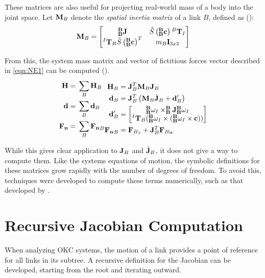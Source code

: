 These matrices are also useful for projecting real-world mass of a body into the joint space. Let $\mathbf{M}_B$ denote the \emph{spatial inertia matrix} of a link $B$, defined as (\cite{featherstone_2007}):
\begin{align} \label{eqn:spat_mass}
	\mathbf{M}_B =
	\begin{bmatrix}
	^\mathbf{B}_\mathbf{B}\mathbf{J}                 & \mathring{S}\left(^\mathbf{B}_\mathbf{B}\mathbf{c}\right){^B\mathbf{T}_I} \\
	{^I\mathbf{T}_B}\mathring{S}\left(^\mathbf{B}_\mathbf{B}\mathbf{c}\right)^T & m_B {\mathbf{I}}_{3x3}      
	\end{bmatrix}
\end{align}

\noindent From this, the system mass matrix and vector of fictitious forces vector described in \ref{eqn:NE1} can be computed (\cite{isenberg_2020}).
\begin{align} \label{eqn:NE2}
	\begin{split}
	{\mathbf{H}}    & = \Big.\sum_B {\mathbf{H}}_B                           \\
	{\mathbf{d}}    & = \Big.\sum_B {\mathbf{d}}_B                           \\
	{\mathbf{F_n}}   & =  \Big.\sum_B {\mathbf{F_n}}_B                         
	\end{split}
	\begin{split}
	{\mathbf{H}}_B  & = {\mathbf{J}^T_B}\mathbf{M}_B\mathbf{J}_B                           \\
	{\mathbf{d}}_B  & = \mathbf{J}^T_B \left (\mathbf{M}_B \dot{\mathbf{J}}_B + {\mathbf{d}}'_B \right) \\
	{\mathbf{d}}_B' & = \begin{bmatrix}                            
	{^\mathbf{B}_\mathbf{B}\omega_I } \times ^\mathbf{B}_\mathbf{B}\mathbf{J} {^\mathbf{B}_\mathbf{B}\omega_I} \\
	{^I\mathbf{T}_B}  (^\mathbf{B}_\mathbf{B}\omega_I \times (^\mathbf{B}_\mathbf{B}\omega_I \times \mathbf{c}))\\
	\end{bmatrix} \\
	{\mathbf{F_n}}_B & = {\mathbf{F}}_{B_J} + \mathbf{J}_B^T {\mathbf{F}}_{B_W}
	\end{split} 
\end{align}

\noindent While this gives clear application to {$\mathbf{J}_B$} and $\dot{\mathbf{J}}_B$, it does not give a way to compute them. Like the systems equations of motion, the symbolic definitions for these matrices grow rapidly with the number of degrees of freedom. To avoid this, techniques were developed to compute these terms numerically, such as that developed by \cite{isenberg_2020}.

\section{Recursive Jacobian Computation}
\noindent When analyzing OKC systems, the motion of a link provides a point of reference for all links in its subtree. A recursive definition for the Jacobian can be developed, starting from the root and iterating outward. %

